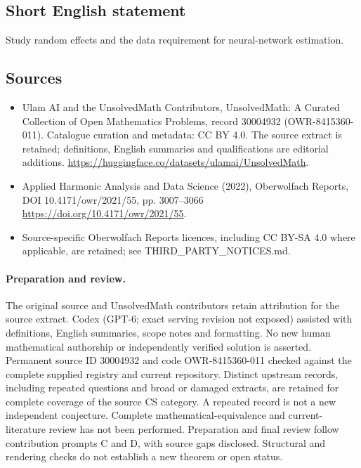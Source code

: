 \documentclass[11pt]{article}
\begin{document}
\subsection{Short English statement}
Study random effects and the data requirement for neural-network estimation.
\subsection{Sources}
\begin{itemize}
\item[\hypertarget{source:30004932:1}{S1}] Ulam AI and the UnsolvedMath Contributors, UnsolvedMath: A Curated Collection of Open Mathematics Problems, record 30004932 (OWR-8415360-011). Catalogue curation and metadata: CC BY 4.0. The source extract is retained; definitions, English summaries and qualifications are editorial additions.
\url{https://huggingface.co/datasets/ulamai/UnsolvedMath}.
\item[\hypertarget{source:30004932:2}{S2}] Applied Harmonic Analysis and Data Science (2022), Oberwolfach Reports, DOI 10.4171/owr/2021/55, pp. 3007--3066
\url{https://doi.org/10.4171/owr/2021/55}.
\item Source-specific Oberwolfach Reports licences, including CC BY-SA 4.0 where applicable, are retained; see THIRD\_PARTY\_NOTICES.md.
\end{itemize}
\paragraph{Preparation and review.}
The original source and UnsolvedMath contributors retain attribution for the source extract. Codex (GPT-6; exact serving revision not exposed) assisted with definitions, English summaries, scope notes and formatting. No new human mathematical authorship or independently verified solution is asserted. Permanent source ID 30004932 and code OWR-8415360-011 checked against the complete supplied registry and current repository. Distinct upstream records, including repeated questions and broad or damaged extracts, are retained for complete coverage of the source CS category. A repeated record is not a new independent conjecture. Complete mathematical-equivalence and current-literature review has not been performed. Preparation and final review follow contribution prompts C and D, with source gaps disclosed. Structural and rendering checks do not establish a new theorem or open status.
\label{end:30004932}
\end{document}

